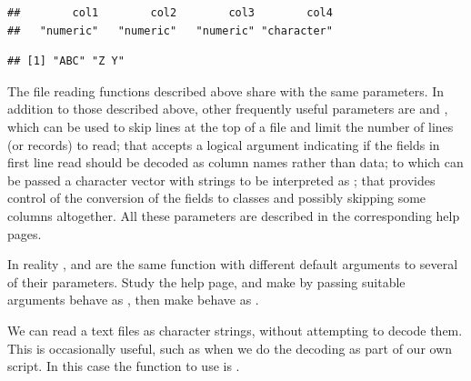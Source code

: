 \documentclass[krantz2]{krantz}\usepackage{knitr}%
\begin{document}
\begin{knitrout}\footnotesize
{}\color{fgcolor}\begin{kframe}
\begin{alltt}
\end{alltt}
\begin{verbatim}
##        col1        col2        col3        col4 
##   "numeric"   "numeric"   "numeric" "character"
\end{verbatim}
\begin{alltt}
\hlstd{from_fwf_a.df[[}\hlstd{]]}
\end{alltt}
\begin{verbatim}
## [1] "ABC" "Z Y"
\end{verbatim}
\end{kframe}
\end{knitrout}

\begin{explainbox}
  The file reading functions described above share with  the same parameters. In addition to those described above, other frequently useful parameters are  and , which can be used to skip lines at the top of a file and limit the number of lines (or records) to read;  that accepts a logical argument indicating if the fields in first line read should be decoded as column names rather than data;  to which can be passed a character vector with strings to be interpreted as ;  that provides control of the conversion of the fields to \Rlang classes and possibly skipping some columns altogether. All these parameters are described in the corresponding help pages.
\end{explainbox}

\begin{playground}
In reality  ,  and  are the same function with different default arguments to several of their parameters. Study the help page, and make by passing suitable arguments  behave as , then make  behave as .
\end{playground}

\begin{explainbox}
We can read a text files as character strings, without attempting to decode them. This is occasionally useful, such as when we do the decoding as part of our own script. In this case the function to use is .
\end{explainbox}
\end{document}

